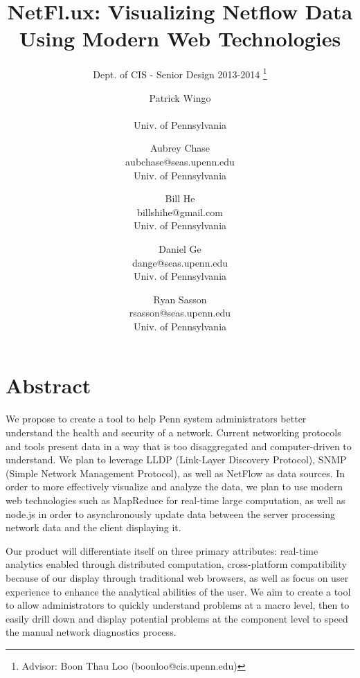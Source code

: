 \documentclass{sig-alternate}
\begin{document}
\title{NetFl.ux: Visualizing Netflow Data Using Modern Web Technologies}
\subtitle{Dept. of CIS - Senior Design 2013-2014
    \thanks{Advisor: Boon Thau Loo (boonloo@cis.upenn.edu)}}
\author{Patrick Wingo\\ \\ Univ. of Pennsylvania
    \and Aubrey Chase\\ aubchase@seas.upenn.edu\\ Univ. of Pennsylvania
    \and Bill He\\ billshihe@gmail.com\\ Univ. of Pennsylvania
    \and Daniel Ge\\ dange@seas.upenn.edu\\ Univ. of Pennsylvania
    \and Ryan Sasson\\ rsasson@seas.upenn.edu\\ Univ. of Pennsylvania}

\maketitle

\section*{Abstract}

We propose to create a tool to help Penn system administrators better understand
the health and security of a network.  Current networking protocols and tools
present data in a way that is too disaggregated and computer-driven to
understand. We plan to leverage LLDP (Link-Layer Discovery Protocol), SNMP
(Simple Network Management Protocol), as well as NetFlow as data sources. In
order to more effectively visualize and analyze the data, we plan to use modern
web technologies such as MapReduce for real-time large computation, as well as
node.js in order to asynchronously update data between the server processing
network data and the client displaying it.

Our product will differentiate itself on three primary attributes: real-time
analytics enabled through distributed computation, cross-platform compatibility
because of our display through traditional web browsers, as well as focus on
user experience to enhance the analytical abilities of the user. We aim to
create a tool to allow administrators to quickly understand problems at a macro
level, then to easily drill down and display potential problems at the component
level to speed the manual network diagnostics process.
\end{document}
